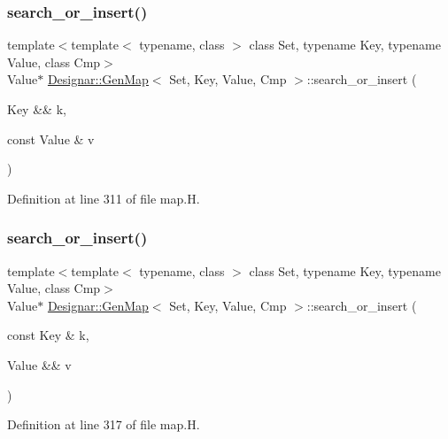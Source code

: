 \subsubsection{\texorpdfstring{search\+\_\+or\+\_\+insert()}{search\_or\_insert()}\hspace{0.1cm}{\footnotesize\ttfamily [2/6]}}
{\footnotesize\ttfamily template$<$template$<$ typename, class $>$ class Set, typename Key, typename Value, class Cmp$>$ \\
Value$\ast$ \hyperlink{class_designar_1_1_gen_map}{Designar\+::\+Gen\+Map}$<$ Set, Key, Value, Cmp $>$\+::search\+\_\+or\+\_\+insert (\begin{DoxyParamCaption}\item[{Key \&\&}]{k,  }\item[{const Value \&}]{v }\end{DoxyParamCaption})\hspace{0.3cm}{\ttfamily [inline]}}



Definition at line 311 of file map.\+H.

\mbox{\label{class_designar_1_1_gen_map_a17eac83eb57f8181aaaeeda18d155f31}} 
\subsubsection{\texorpdfstring{search\+\_\+or\+\_\+insert()}{search\_or\_insert()}\hspace{0.1cm}{\footnotesize\ttfamily [3/6]}}
{\footnotesize\ttfamily template$<$template$<$ typename, class $>$ class Set, typename Key, typename Value, class Cmp$>$ \\
Value$\ast$ \hyperlink{class_designar_1_1_gen_map}{Designar\+::\+Gen\+Map}$<$ Set, Key, Value, Cmp $>$\+::search\+\_\+or\+\_\+insert (\begin{DoxyParamCaption}\item[{const Key \&}]{k,  }\item[{Value \&\&}]{v }\end{DoxyParamCaption})\hspace{0.3cm}{\ttfamily [inline]}}



Definition at line 317 of file map.\+H.

